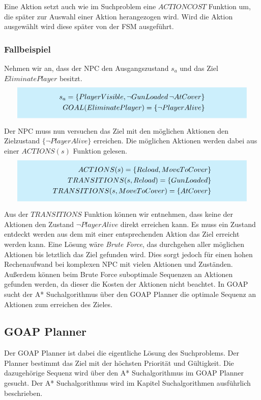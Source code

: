 Eine Aktion setzt auch wie im Suchproblem eine $ACTIONCOST$ Funktion um, die später zur Auswahl einer Aktion herangezogen wird. Wird die Aktion ausgewählt wird diese später von der FSM ausgeführt.


\subsubsection{Fallbeispiel}

Nehmen wir an, dass der NPC den Ausgangszustand $s_a$ und das Ziel $EliminatePlayer$ besitzt.
\[
	\highlightbox{0.9\textwidth}{$
		\begin{align*}
			s_a = \{PlayerVisible, \lnot GunLoaded\, \lnot AtCover\} \\
			GOAL(EliminatePlayer) = \{\lnot PlayerAlive\}
		\end{align*}
	$}
\]

Der NPC muss nun versuchen das Ziel mit den möglichen Aktionen den Zielzustand $\{\lnot PlayerAlive\}$ erreichen. Die möglichen Aktionen werden dabei aus einer $ACTIONS(s)$ Funktion gelesen.
\[
	\highlightbox{0.9\textwidth}{$
		\begin{align*}
			ACTIONS(s) = \{Reload, MoveToCover\} \\
			TRANSITIONS(s,Reload) = \{GunLoaded\} \\
			TRANSITIONS(s,MoveToCover) = \{AtCover\}
		\end{align*}
	$}
\]

Aus der $TRANSITIONS$ Funktion können wir entnehmen, dass keine der Aktionen den Zustand $\lnot PlayerAlive$ direkt erreichen kann. Es muss ein Zustand entdeckt werden aus dem mit einer entsprechenden Aktion das Ziel erreicht werden kann. Eine Lösung wäre \textit{Brute Force}, das durchgehen aller möglichen Aktionen bis letztlich das Ziel gefunden wird. Dies sorgt jedoch für einen hohen Rechenaufwand bei komplexen NPC mit vielen Aktionen und Zuständen. Außerdem können beim Brute Force suboptimale Sequenzen an Aktionen gefunden werden, da dieser die Kosten der Aktionen nicht beachtet. In GOAP sucht der A* Suchalgorithmus über den GOAP Planner die optimale Sequenz an Aktionen zum erreichen des Zieles.


\subsection{GOAP Planner}

Der GOAP Planner ist dabei die eigentliche Lösung des Suchproblems. Der Planner bestimmt das Ziel mit der höchsten Priorität und Gültigkeit. Die dazugehörige Sequenz wird über den A* Suchalgorithmus im GOAP Planner gesucht. Der A* Suchalgorithmus wird im Kapitel Suchalgorithmen ausführlich beschrieben.

